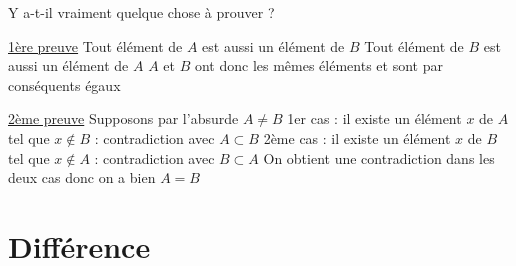 \newline


\newline

\begin{preuve}
Y a-t-il vraiment quelque chose à prouver ?
\end{preuve}

\newline

\begin{preuve}
\underline{1ère preuve}\newline
Tout élément de $A$ est aussi un élément de $B$\newline
Tout élément de $B$ est aussi un élément de $A$\newline
$A$ et $B$ ont donc les mêmes éléments et sont par conséquents égaux\newline

\underline{2ème preuve}\newline
Supposons par l'absurde $A\neq B$
1er cas : il existe un élément $x$ de $A$ tel que $x\notin B$ : contradiction avec $A \subset B$\newline
2ème cas : il existe un élément $x$ de $B$ tel que $x\notin A$ : contradiction avec $B \subset A$\newline
On obtient une contradiction dans les deux cas donc on a bien $A = B$
\end{preuve}
\section{Différence}
\newline

